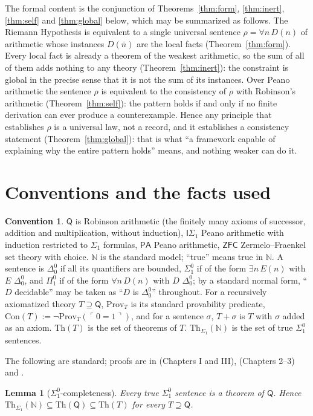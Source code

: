 \documentclass[11pt]{article}
\newtheorem{lemma}[theorem]{Lemma}
\theoremstyle{definition}
\newtheorem{convention}[theorem]{Convention}
\theoremstyle{remark}
\newcommand{\N}{\mathbb N}
\newcommand{\PA}{\mathsf{PA}}
\newcommand{\ZFC}{\mathsf{ZFC}}
\newcommand{\RA}{\mathsf{Q}}
\newcommand{\ISig}{\mathsf{I}\Sigma_1}
\newcommand{\Prov}{\mathrm{Prov}}
\newcommand{\Con}{\mathrm{Con}}
\newcommand{\Th}{\mathrm{Th}}
\newcommand{\gn}[1]{\ulcorner #1\urcorner}
\newcommand{\Pione}{\Pi^0_1}
\newcommand{\Sigone}{\Sigma^0_1}
\newcommand{\Dzero}{\Delta^0_0}
\begin{document}
The formal content is the conjunction of Theorems~\ref{thm:form}, \ref{thm:inert}, \ref{thm:self} and \ref{thm:global} below, which may be summarized as follows. The Riemann Hypothesis is equivalent to a single universal sentence $\rho=\forall n\,D(n)$ of arithmetic whose instances $D(\bar n)$ are the local facts (Theorem~\ref{thm:form}). Every local fact is already a theorem of the weakest arithmetic, so the sum of all of them adds nothing to any theory (Theorem~\ref{thm:inert}): the constraint is global in the precise sense that it is not the sum of its instances. Over Peano arithmetic the sentence $\rho$ is equivalent to the consistency of $\rho$ with Robinson's arithmetic (Theorem~\ref{thm:self}): the pattern holds if and only if no finite derivation can ever produce a counterexample. Hence any principle that establishes $\rho$ is a universal law, not a record, and it establishes a consistency statement (Theorem~\ref{thm:global}): that is what ``a framework capable of explaining why the entire pattern holds'' means, and nothing weaker can do it.

\section{Conventions and the facts used}

\begin{convention}
$\RA$ is Robinson arithmetic (the finitely many axioms of successor, addition and multiplication, without induction), $\ISig$ Peano arithmetic with induction restricted to $\Sigma_1$ formulas, $\PA$ Peano arithmetic, $\ZFC$ Zermelo--Fraenkel set theory with choice. $\N$ is the standard model; ``true'' means true in $\N$. A sentence is $\Dzero$ if all its quantifiers are bounded, $\Sigone$ if of the form $\exists n\,E(n)$ with $E$ $\Dzero$, and $\Pione$ if of the form $\forall n\,D(n)$ with $D$ $\Dzero$; by a standard normal form, ``$D$ decidable'' may be taken as ``$D$ is $\Dzero$'' throughout. For a recursively axiomatized theory $T\supseteq\RA$, $\Prov_T$ is its standard provability predicate, $\Con(T):=\neg\Prov_T(\gn{0=1})$, and for a sentence $\sigma$, $T+\sigma$ is $T$ with $\sigma$ added as an axiom. $\Th(T)$ is the set of theorems of $T$. $\Th_{\Sigma_1}(\N)$ is the set of true $\Sigone$ sentences.
\end{convention}

The following are standard; proofs are in \cite{HP} (Chapters I and III), \cite{Boolos} (Chapters 2--3) and \cite{Smorynski}.

\begin{lemma}[$\Sigone$-completeness]\label{lem:sigma}
Every true $\Sigone$ sentence is a theorem of $\RA$. Hence $\Th_{\Sigma_1}(\N)\subseteq\Th(\RA)\subseteq\Th(T)$ for every $T\supseteq\RA$.
\end{lemma}
\end{document}
